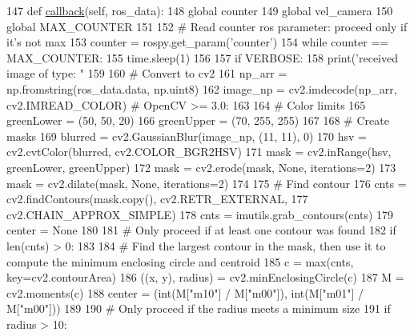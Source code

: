 \begin{DoxyCode}
147     \textcolor{keyword}{def }\hyperlink{classstate__manager_1_1find__and__follow__ball_ab8dc079ef8ce39c9679ed9e5428b4e8c}{callback}(self, ros\_data):
148         \textcolor{keyword}{global} counter
149         \textcolor{keyword}{global} vel\_camera
150         \textcolor{keyword}{global} MAX\_COUNTER
151 
152         \textcolor{comment}{# Read counter ros parameter: proceed only if it's not max}
153         counter = rospy.get\_param(\textcolor{stringliteral}{'counter'})
154         \textcolor{keywordflow}{while} counter == MAX\_COUNTER:
155             time.sleep(1)
156 
157         \textcolor{keywordflow}{if} VERBOSE:
158             print(\textcolor{stringliteral}{'received image of type: "%
159 
160         \textcolor{comment}{# Convert to cv2}
161         np\_arr = np.fromstring(ros\_data.data, np.uint8)
162         image\_np = cv2.imdecode(np\_arr, cv2.IMREAD\_COLOR)  \textcolor{comment}{# OpenCV >= 3.0:}
163 
164         \textcolor{comment}{# Color limits}
165         greenLower = (50, 50, 20)
166         greenUpper = (70, 255, 255)
167 
168         \textcolor{comment}{# Create masks}
169         blurred = cv2.GaussianBlur(image\_np, (11, 11), 0)
170         hsv = cv2.cvtColor(blurred, cv2.COLOR\_BGR2HSV)
171         mask = cv2.inRange(hsv, greenLower, greenUpper)
172         mask = cv2.erode(mask, \textcolor{keywordtype}{None}, iterations=2)
173         mask = cv2.dilate(mask, \textcolor{keywordtype}{None}, iterations=2)
174 
175         \textcolor{comment}{# Find contour}
176         cnts = cv2.findContours(mask.copy(), cv2.RETR\_EXTERNAL,
177                                 cv2.CHAIN\_APPROX\_SIMPLE)
178         cnts = imutils.grab\_contours(cnts)
179         center = \textcolor{keywordtype}{None}
180 
181         \textcolor{comment}{# Only proceed if at least one contour was found}
182         \textcolor{keywordflow}{if} len(cnts) > 0:
183 
184             \textcolor{comment}{# Find the largest contour in the mask, then use it to compute the minimum enclosing circle and
       centroid}
185             c = max(cnts, key=cv2.contourArea)
186             ((x, y), radius) = cv2.minEnclosingCircle(c)
187             M = cv2.moments(c)
188             center = (int(M[\textcolor{stringliteral}{"m10"}] / M[\textcolor{stringliteral}{"m00"}]), int(M[\textcolor{stringliteral}{"m01"}] / M[\textcolor{stringliteral}{"m00"}]))
189 
190             \textcolor{comment}{# Only proceed if the radius meets a minimum size}
191             \textcolor{keywordflow}{if} radius > 10:
}
\end{DoxyCode}

